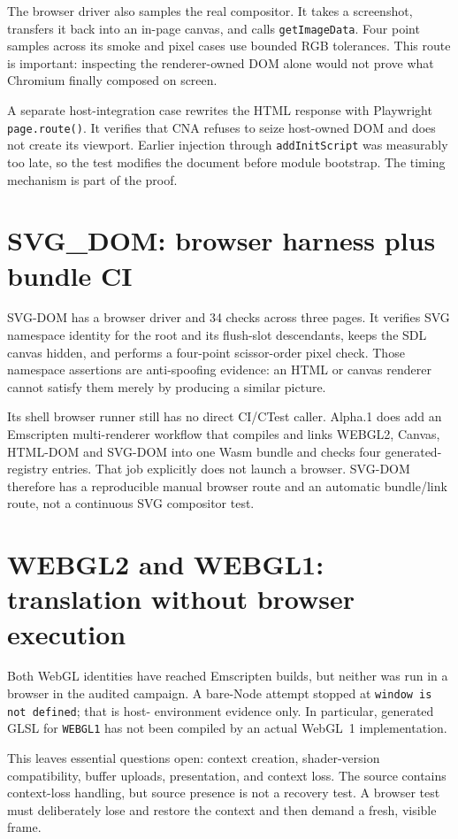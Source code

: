 The browser driver also samples the real compositor.  It takes a screenshot, transfers it
back into an in-page canvas, and calls \texttt{getImageData}.  Four point samples across its
smoke and pixel cases use bounded RGB tolerances.  This route is important: inspecting the
renderer-owned DOM alone would not prove what Chromium finally composed on screen.

A separate host-integration case rewrites the HTML response with Playwright
\texttt{page.route()}.  It verifies that CNA refuses to seize host-owned DOM and does not create
its viewport.  Earlier injection through \texttt{addInitScript} was measurably too late, so the
test modifies the document before module bootstrap.  The timing mechanism is part of the proof.

\section{SVG\_DOM: browser harness plus bundle CI}

SVG-DOM has a browser driver and 34 checks across three pages.  It verifies SVG namespace
identity for the root and its flush-slot descendants, keeps the SDL canvas hidden, and performs
a four-point scissor-order pixel check.  Those namespace assertions are anti-spoofing evidence:
an HTML or canvas renderer cannot satisfy them merely by producing a similar picture.

Its shell browser runner still has no direct CI/CTest caller.  Alpha.1 does add an Emscripten
multi-renderer workflow that compiles and links WEBGL2, Canvas, HTML-DOM and SVG-DOM into one
Wasm bundle and checks four generated-registry entries.  That job explicitly does not launch a
browser.  SVG-DOM therefore has a reproducible manual browser route and an automatic bundle/link
route, not a continuous SVG compositor test.

\section{WEBGL2 and WEBGL1: translation without browser execution}

Both WebGL identities have reached Emscripten builds, but neither was run in a browser in the
audited campaign.  A bare-Node attempt stopped at \texttt{window is not defined}; that is host-
environment evidence only.  In particular, generated GLSL for \texttt{WEBGL1} has not been
compiled by an actual WebGL~1 implementation.

This leaves essential questions open: context creation, shader-version compatibility, buffer
uploads, presentation, and context loss.  The source contains context-loss handling, but source
presence is not a recovery test.  A browser test must deliberately lose and restore the context
and then demand a fresh, visible frame.

